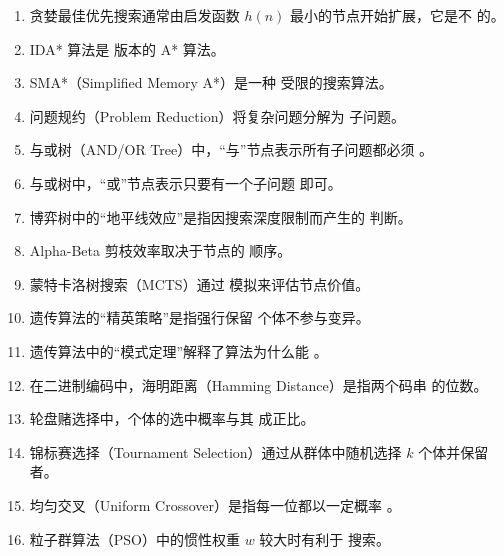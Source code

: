\begin{enumerate}[resume,leftmargin=2em,itemsep=1pt]
\item 贪婪最佳优先搜索通常由启发函数 $h(n)$ 最小的节点开始扩展，它是不 \underline{\hspace{3em}} 的。
\item IDA* 算法是 \underline{\hspace{3em}} 版本的 A* 算法。
\item SMA*（Simplified Memory A*）是一种 \underline{\hspace{3em}} 受限的搜索算法。
\item 问题规约（Problem Reduction）将复杂问题分解为 \underline{\hspace{3em}} 子问题。
\item 与或树（AND/OR Tree）中，“与”节点表示所有子问题都必须 \underline{\hspace{3em}}。
\item 与或树中，“或”节点表示只要有一个子问题 \underline{\hspace{3em}} 即可。
\item 博弈树中的“地平线效应”是指因搜索深度限制而产生的 \underline{\hspace{3em}} 判断。
\item Alpha-Beta 剪枝效率取决于节点的 \underline{\hspace{3em}} 顺序。
\item 蒙特卡洛树搜索（MCTS）通过 \underline{\hspace{3em}} 模拟来评估节点价值。
\item 遗传算法的“精英策略”是指强行保留 \underline{\hspace{3em}} 个体不参与变异。
\item 遗传算法中的“模式定理”解释了算法为什么能 \underline{\hspace{3em}}。
\item 在二进制编码中，海明距离（Hamming Distance）是指两个码串 \underline{\hspace{3em}} 的位数。
\item 轮盘赌选择中，个体的选中概率与其 \underline{\hspace{3em}} 成正比。
\item 锦标赛选择（Tournament Selection）通过从群体中随机选择 $k$ 个体并保留 \underline{\hspace{3em}} 者。
\item 均匀交叉（Uniform Crossover）是指每一位都以一定概率 \underline{\hspace{3em}}。
\item 粒子群算法（PSO）中的惯性权重 $w$ 较大时有利于 \underline{\hspace{3em}} 搜索。

\end{enumerate}
